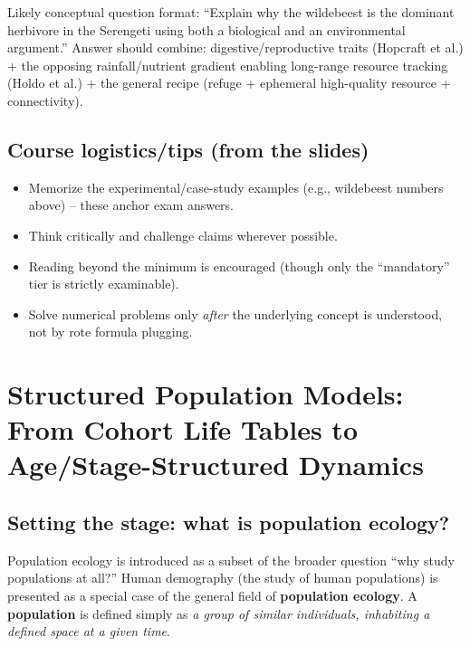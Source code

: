 \documentclass[11pt,a4paper]{article}
\begin{document}
\begin{exambox}
Likely conceptual question format: ``Explain why the wildebeest is the dominant herbivore in the Serengeti using both a biological and an environmental argument.'' Answer should combine: digestive/reproductive traits (Hopcraft et al.) $+$ the opposing rainfall/nutrient gradient enabling long-range resource tracking (Holdo et al.) $+$ the general recipe (refuge + ephemeral high-quality resource + connectivity).
\end{exambox}

\subsection{Course logistics/tips (from the slides)}
\begin{itemize}[leftmargin=1.5em]
\item Memorize the experimental/case-study examples (e.g., wildebeest numbers above) -- these anchor exam answers.
\item Think critically and challenge claims wherever possible.
\item Reading beyond the minimum is encouraged (though only the ``mandatory'' tier is strictly examinable).
\item Solve numerical problems only \emph{after} the underlying concept is understood, not by rote formula plugging.
\end{itemize}

\newpage

\section{Structured Population Models: From Cohort Life Tables to Age/Stage-Structured Dynamics}

\subsection{Setting the stage: what is population ecology?}
Population ecology is introduced as a subset of the broader question ``why study populations at all?'' Human demography (the study of human populations) is presented as a special case of the general field of \textbf{population ecology}. A \textbf{population} is defined simply as \emph{a group of similar individuals, inhabiting a defined space at a given time}.
\end{document}
